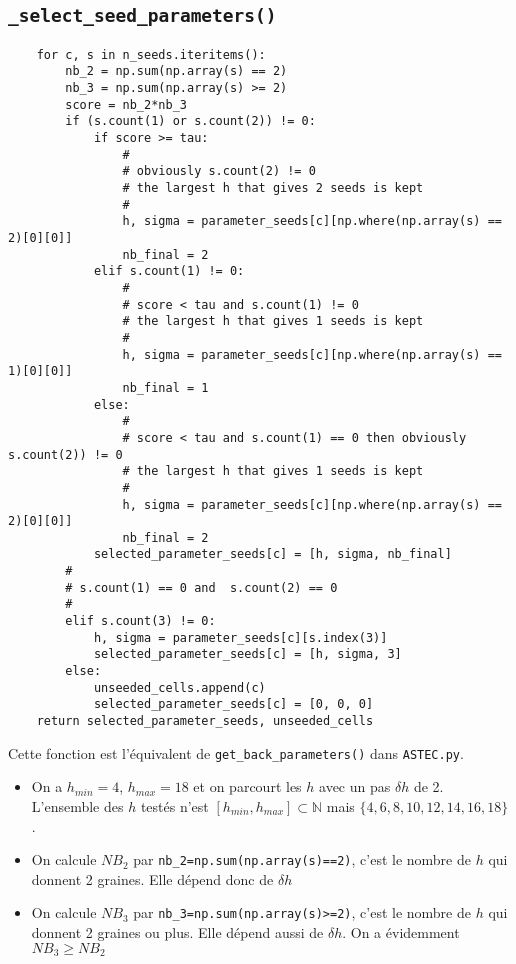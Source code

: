 \documentclass{article}
\def \mycolor {red}
\begin{document}
\subsection{\texttt{\_select\_seed\_parameters()}}

\begin{verbatim}
    for c, s in n_seeds.iteritems():
        nb_2 = np.sum(np.array(s) == 2)
        nb_3 = np.sum(np.array(s) >= 2)
        score = nb_2*nb_3
        if (s.count(1) or s.count(2)) != 0:
            if score >= tau:
                #
                # obviously s.count(2) != 0
                # the largest h that gives 2 seeds is kept
                #
                h, sigma = parameter_seeds[c][np.where(np.array(s) == 2)[0][0]]
                nb_final = 2
            elif s.count(1) != 0:
                #
                # score < tau and s.count(1) != 0
                # the largest h that gives 1 seeds is kept
                #
                h, sigma = parameter_seeds[c][np.where(np.array(s) == 1)[0][0]]
                nb_final = 1
            else:
                #
                # score < tau and s.count(1) == 0 then obviously s.count(2)) != 0
                # the largest h that gives 1 seeds is kept
                #
                h, sigma = parameter_seeds[c][np.where(np.array(s) == 2)[0][0]]
                nb_final = 2
            selected_parameter_seeds[c] = [h, sigma, nb_final]
        #
        # s.count(1) == 0 and  s.count(2) == 0
        #
        elif s.count(3) != 0:
            h, sigma = parameter_seeds[c][s.index(3)]
            selected_parameter_seeds[c] = [h, sigma, 3]
        else:
            unseeded_cells.append(c)
            selected_parameter_seeds[c] = [0, 0, 0]
    return selected_parameter_seeds, unseeded_cells
\end{verbatim}

\color{\mycolor}
Cette fonction est l'\'equivalent de \verb|get_back_parameters()|  dans \verb|ASTEC.py|.

\begin{itemize}
\itemsep -0.5ex
\item On a $h_{min}=4$, $h_{max}=18$ et on parcourt les $h$ avec un pas  $\delta h$ de 2. L'ensemble des $h$ test\'es n'est $[h_{min}, h_{max}] \subset \mathbb{N}$ mais $\{4, 6, 8, 10, 12, 14, 16, 18\}$.
\item On calcule $NB_2$ par \verb|nb_2=np.sum(np.array(s)==2)|, c'est le nombre de $h$ qui donnent 2 graines. Elle d\'epend donc de $\delta h$
\item On calcule $NB_3$ par \verb|nb_3=np.sum(np.array(s)>=2)|, c'est le nombre de $h$ qui donnent 2 graines ou plus. Elle d\'epend aussi de $\delta h$. On a \'evidemment $NB_3 \geq NB_2$
\end{itemize}
\end{document}
